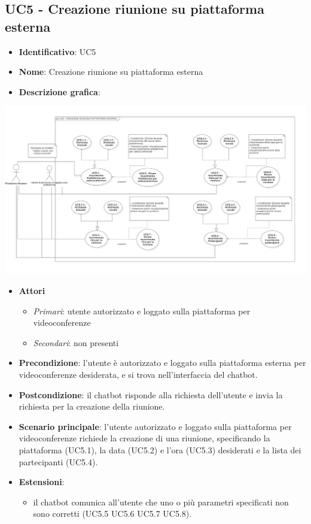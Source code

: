 \subsection{UC5 - Creazione riunione su piattaforma esterna}
\begin{itemize}
    \item \textbf{Identificativo}: UC5
    \item \textbf{Nome}: Creazione riunione su piattaforma esterna
    \item \textbf{Descrizione grafica}:
\end{itemize}
\begin{center}
    \includegraphics{images/UC5.png} 
\end{center}
 \begin{itemize}
    \item \textbf{Attori}
 \begin{itemize} 
    \item \textit{Primari}: utente autorizzato e loggato sulla piattaforma per videoconferenze
    \item \textit{Secondari}: non presenti
 \end{itemize}
 \item \textbf{Precondizione}: l'utente è autorizzato e loggato sulla piattaforma esterna per videoconferenze desiderata, e si trova nell'interfaccia del chatbot.
 \item \textbf{Postcondizione}: il chatbot risponde alla richiesta dell'utente e invia la richiesta per la creazione della riunione.
 \item \textbf{Scenario principale}: l'utente autorizzato e loggato sulla piattaforma per videoconferenze richiede la creazione di una riunione, specificando la piattaforma (UC5.1), la data (UC5.2) e l'ora (UC5.3) desiderati e la lista dei partecipanti (UC5.4).
 \item \textbf{Estensioni}: 
 \begin{itemize} 
    \item il chatbot comunica all'utente che uno o più parametri specificati non sono corretti (UC5.5 UC5.6 UC5.7 UC5.8).
 \end{itemize}
\end{itemize}
\newpage


